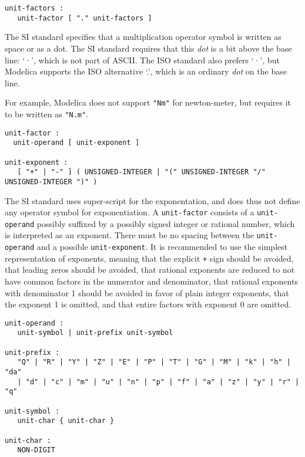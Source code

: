 \begin{lstlisting}[language=grammar]
unit-factors :
   unit-factor [ "." unit-factors ]
\end{lstlisting}

The SI standard specifies that a multiplication operator symbol is written as space or as a dot.
The SI standard requires that this \emph{dot} is a bit above the base line: `·', which is not part of ASCII.
The ISO standard also prefers `·', but Modelica supports the ISO alternative `.', which is an ordinary \emph{dot} on the base line.

For example, Modelica does not support \lstinline!"Nm"! for newton-meter, but requires it to be written as \lstinline!"N.m"!.

\begin{lstlisting}[language=grammar]
unit-factor :
  unit-operand [ unit-exponent ]

unit-exponent :
   [ "+" | "-" ] ( UNSIGNED-INTEGER | "(" UNSIGNED-INTEGER "/" UNSIGNED-INTEGER ")" )
\end{lstlisting}

The SI standard uses super-script for the exponentation, and does thus not define any operator symbol for exponentiation.
A \lstinline[language=grammar]!unit-factor! consists of a \lstinline[language=grammar]!unit-operand! possibly suffixed by a possibly signed integer or rational number, which is interpreted as an exponent.
There must be no spacing between the \lstinline[language=grammar]!unit-operand! and a possible \lstinline[language=grammar]!unit-exponent!.
It is recommended to use the simplest representation of exponents, meaning that the explicit \lstinline!+! sign should be avoided, that leading zeros should be avoided, that rational exponents are reduced to not have common factors in the numerator and denominator, that rational exponents with denominator 1 should be avoided in favor of plain integer exponents, that the exponent 1 is omitted, and that entire factors with exponent 0 are omitted.

\begin{lstlisting}[language=grammar]
unit-operand :
   unit-symbol | unit-prefix unit-symbol

unit-prefix :
   "Q" | "R" | "Y" | "Z" | "E" | "P" | "T" | "G" | "M" | "k" | "h" | "da"
   | "d" | "c" | "m" | "u" | "n" | "p" | "f" | "a" | "z" | "y" | "r" | "q"

unit-symbol :
   unit-char { unit-char }

unit-char :
   NON-DIGIT
\end{lstlisting}

